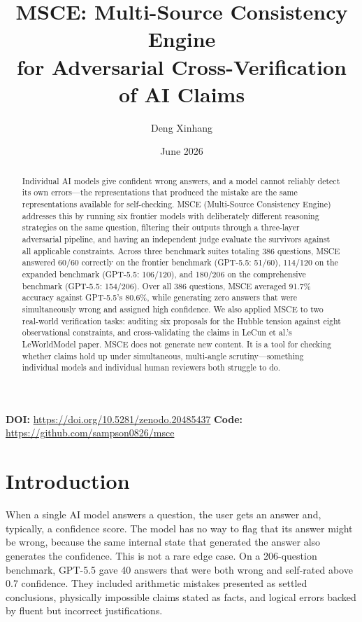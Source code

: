 \documentclass[11pt,a4paper]{article}
\title{\textbf{MSCE: Multi-Source Consistency Engine\\for Adversarial Cross-Verification of AI Claims}}
\author[1]{Deng Xinhang}
\affil[1]{Independent Researcher, Shenzhen, China. \texttt{sampson1735937149@gmail.com}}
\date{June 2026}
\begin{document}
\maketitle

\begin{center}
\small
\textbf{DOI:} \url{https://doi.org/10.5281/zenodo.20485437} \quad
\textbf{Code:} \url{https://github.com/sampson0826/msce}
\end{center}

\vspace{-4mm}

\begin{abstract}
\noindent
Individual AI models give confident wrong answers, and a model cannot reliably detect its own errors---the representations that produced the mistake are the same representations available for self-checking. MSCE (Multi-Source Consistency Engine) addresses this by running six frontier models with deliberately different reasoning strategies on the same question, filtering their outputs through a three-layer adversarial pipeline, and having an independent judge evaluate the survivors against all applicable constraints. Across three benchmark suites totaling 386 questions, MSCE answered 60/60 correctly on the frontier benchmark (GPT-5.5: 51/60), 114/120 on the expanded benchmark (GPT-5.5: 106/120), and 180/206 on the comprehensive benchmark (GPT-5.5: 154/206). Over all 386 questions, MSCE averaged 91.7\% accuracy against GPT-5.5's 80.6\%, while generating zero answers that were simultaneously wrong and assigned high confidence. We also applied MSCE to two real-world verification tasks: auditing six proposals for the Hubble tension against eight observational constraints, and cross-validating the claims in LeCun et al.'s LeWorldModel paper. MSCE does not generate new content. It is a tool for checking whether claims hold up under simultaneous, multi-angle scrutiny---something individual models and individual human reviewers both struggle to do.
\end{abstract}

\section{Introduction}

When a single AI model answers a question, the user gets an answer and, typically, a confidence score. The model has no way to flag that its answer might be wrong, because the same internal state that generated the answer also generates the confidence. This is not a rare edge case. On a 206-question benchmark, GPT-5.5 gave 40 answers that were both wrong and self-rated above 0.7 confidence. They included arithmetic mistakes presented as settled conclusions, physically impossible claims stated as facts, and logical errors backed by fluent but incorrect justifications.
\end{document}
